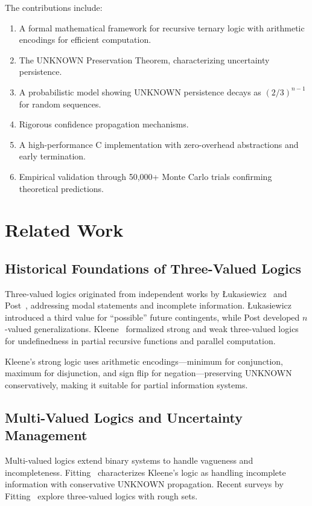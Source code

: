 \documentclass[11pt,a4paper]{article}
\begin{document}
The contributions include:
\begin{enumerate}
    \item A formal mathematical framework for recursive ternary logic with arithmetic encodings for efficient computation.
    \item The UNKNOWN Preservation Theorem, characterizing uncertainty persistence.
    \item A probabilistic model showing UNKNOWN persistence decays as $(2/3)^{n-1}$ for random sequences.
    \item Rigorous confidence propagation mechanisms.
    \item A high-performance C implementation with zero-overhead abstractions and early termination.
    \item Empirical validation through 50,000+ Monte Carlo trials confirming theoretical predictions.
\end{enumerate}

\section{Related Work}

\subsection{Historical Foundations of Three-Valued Logics}

Three-valued logics originated from independent works by Łukasiewicz~\cite{lukasiewicz1920} and Post~\cite{post1921}, addressing modal statements and incomplete information. Łukasiewicz introduced a third value for ``possible'' future contingents, while Post developed $n$-valued generalizations. Kleene~\cite{kleene1952} formalized strong and weak three-valued logics for undefinedness in partial recursive functions and parallel computation.

Kleene's strong logic uses arithmetic encodings—minimum for conjunction, maximum for disjunction, and sign flip for negation—preserving UNKNOWN conservatively, making it suitable for partial information systems.

\subsection{Multi-Valued Logics and Uncertainty Management}

Multi-valued logics extend binary systems to handle vagueness and incompleteness. Fitting~\cite{fitting1991} characterizes Kleene's logic as handling incomplete information with conservative UNKNOWN propagation. Recent surveys by Fitting~\cite{fitting2023} explore three-valued logics with rough sets.
\end{document}
